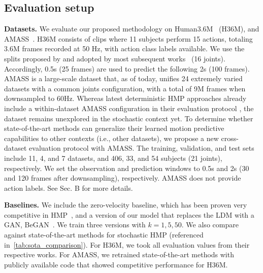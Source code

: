 \documentclass[10pt,twocolumn,letterpaper]{article}
\begin{document}
\subsection{Evaluation setup}
\label{subsec:evaluation_setup} 


\textbf{Datasets.} 
We evaluate our proposed methodology on Human3.6M~\cite{ionescu2013h36m} (H36M), and AMASS~\cite{mahmood2019amass}. 
H36M consists of clips where 11 subjects perform 15 actions, totaling 3.6M frames recorded at 50 Hz, with action class labels available. We use the splits proposed by \cite{yuan2020dlow} and adopted by most subsequent works~\cite{mao2021gsps, salzmann2022motron, ma2022multiobjective, dang2022diverse} (16 joints). Accordingly, 0.5s (25 frames) are used to predict the following 2s (100 frames). 
AMASS is a large-scale dataset that, as of today, unifies 24 extremely varied datasets with a common joints configuration, with a total of 9M frames when downsampled to 60Hz. Whereas latest deterministic HMP approaches already include a within-dataset AMASS configuration in their evaluation protocol \cite{mao2020history, aksan2021spatio, medjaouri2022hr}, the dataset remains unexplored in the stochastic context yet. 
To determine whether state-of-the-art methods can generalize their learned motion predictive capabilities to other contexts (i.e., other datasets), we propose a new cross-dataset evaluation protocol with AMASS. The training, validation, and test sets include 11, 4, and 7 datasets, and 406, 33, and 54 subjects (21 joints), respectively. We set the observation and prediction windows to 0.5s and 2s (30 and 120 frames after downsampling), respectively. AMASS does not provide action labels. See \supp{} Sec. B for more details. 


\textbf{Baselines.} We include the zero-velocity baseline, which has been proven very competitive in HMP~\cite{martinez2017human, Barquero2022}, and a version of our model that replaces the LDM with a GAN, BeGAN~\cite{gan2014}. We train three versions with $k=1, 5, 50$.
We also compare against state-of-the-art methods for stochastic HMP (referenced in~\autoref{tab:sota_comparison}). For H36M, we took all evaluation values from their respective works. For AMASS, we retrained state-of-the-art methods with publicly available code that showed competitive performance for H36M. 
\end{document}
